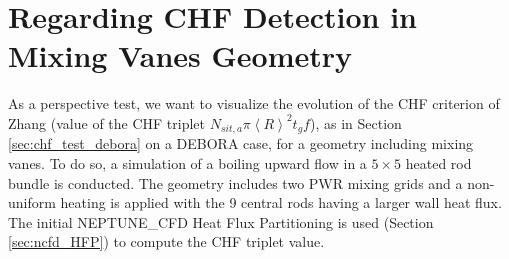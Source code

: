 %
%
%
%
%


\section{Regarding CHF Detection in Mixing Vanes Geometry}

As a perspective test, we want to visualize the evolution of the CHF criterion of Zhang \cite{zhang_new_2022} (value of the CHF triplet $N_{sit,a} \pi \left<R\right>^{2} t_{g}f$), as in Section \ref{sec:chf_test_debora} on a DEBORA case, for a geometry including mixing vanes. To do so, a simulation of a boiling upward flow in a $5 \times 5$ heated rod bundle is conducted. The geometry includes two PWR mixing grids and a non-uniform heating is applied with the 9 central rods having a larger wall heat flux. The initial NEPTUNE\_CFD Heat Flux Partitioning is used (Section \ref{sec:ncfd_HFP}) to compute the CHF triplet value.

